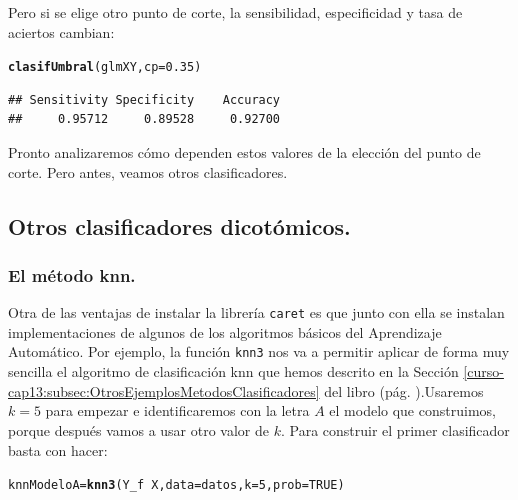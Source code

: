\documentclass[10pt,a4paper]{article}\usepackage[]{graphicx}\usepackage[]{color}
\makeatletter
\newcommand{\hlnum}[1]{\textcolor[rgb]{0.686,0.059,0.569}{#1}}%
\newcommand{\hlopt}[1]{\textcolor[rgb]{0,0,0}{#1}}%
\newcommand{\hlstd}[1]{\textcolor[rgb]{0.345,0.345,0.345}{#1}}%
\newcommand{\hlkwb}[1]{\textcolor[rgb]{0.69,0.353,0.396}{#1}}%
\newcommand{\hlkwc}[1]{\textcolor[rgb]{0.333,0.667,0.333}{#1}}%
\newcommand{\hlkwd}[1]{\textcolor[rgb]{0.737,0.353,0.396}{\textbf{#1}}}%
\newenvironment{kframe}{%
 \def\at@end@of@kframe{}%
 \ifinner\ifhmode%
  \def\at@end@of@kframe{\end{minipage}}%
  \begin{minipage}{\columnwidth}%
 \fi\fi%
 \def\FrameCommand##1{\hskip\@totalleftmargin \hskip-\fboxsep
 \colorbox{shadecolor}{##1}\hskip-\fboxsep
     \hskip-\linewidth \hskip-\@totalleftmargin \hskip\columnwidth}%
 \MakeFramed {\advance\hsize-\width
   \@totalleftmargin\z@ \linewidth\hsize
   \@setminipage}}%
 {\par\unskip\endMakeFramed%
 \at@end@of@kframe}
\newenvironment{knitrout}{}{} %
\makeatother
\begin{document}
Pero si se elige otro punto de corte, la sensibilidad, especificidad y tasa de aciertos cambian:

\begin{knitrout}
\color{fgcolor}\begin{kframe}
\begin{alltt}
\hlkwd{clasifUmbral}\hlstd{(glmXY,} \hlkwc{cp} \hlstd{=} \hlnum{0.35}\hlstd{)}
\end{alltt}
\begin{verbatim}
## Sensitivity Specificity    Accuracy 
##     0.95712     0.89528     0.92700
\end{verbatim}
\end{kframe}
\end{knitrout}

Pronto analizaremos cómo dependen estos valores de la elección del punto de corte. Pero antes, veamos otros clasificadores.

\subsection{Otros clasificadores dicotómicos.}

\subsubsection{El método knn.}

Otra de las ventajas de instalar la librería {\tt caret} es que junto con ella se instalan implementaciones de algunos de los algoritmos básicos del Aprendizaje Automático. Por ejemplo, la función {\tt knn3} nos va a permitir aplicar de forma muy sencilla el algoritmo de clasificación knn que hemos descrito en la Sección
\ref{curso-cap13:subsec:OtrosEjemplosMetodosClasificadores} del libro (pág. \pageref{curso-cap13:subsec:OtrosEjemplosMetodosClasificadores}).Usaremos $k=5$ para empezar e identificaremos con la letra $A$ el modelo que construimos, porque después vamos a usar otro valor de $k$. Para construir el primer clasificador basta con hacer:

\begin{knitrout}
\color{fgcolor}\begin{kframe}
\begin{alltt}
\hlstd{knnModeloA} \hlkwb{=} \hlkwd{knn3}\hlstd{(Y_f} \hlopt{~} \hlstd{X,} \hlkwc{data} \hlstd{= datos,} \hlkwc{k}\hlstd{=}\hlnum{5}\hlstd{,} \hlkwc{prob}\hlstd{=}\hlnum{TRUE}\hlstd{)}
\end{alltt}
\end{kframe}
\end{knitrout}
\end{document}

